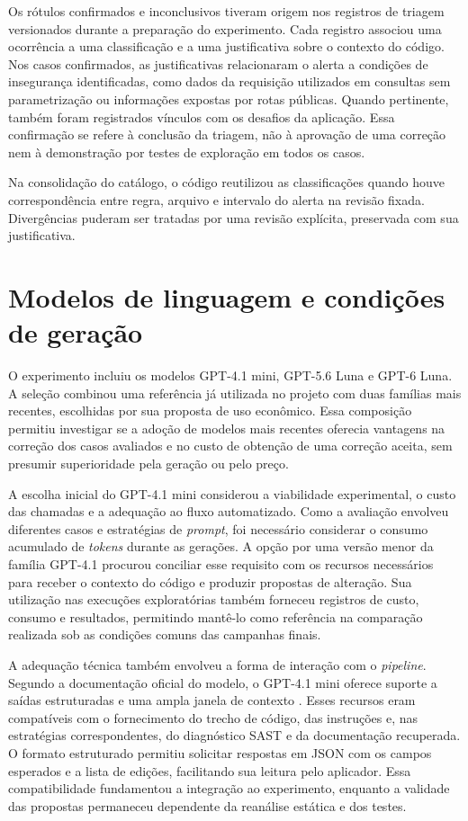Os rótulos confirmados e inconclusivos tiveram origem nos registros de triagem versionados durante a preparação do experimento. Cada registro associou uma ocorrência a uma classificação e a uma justificativa sobre o contexto do código. Nos casos confirmados, as justificativas relacionaram o alerta a condições de insegurança identificadas, como dados da requisição utilizados em consultas sem parametrização ou informações expostas por rotas públicas. Quando pertinente, também foram registrados vínculos com os desafios da aplicação. Essa confirmação se refere à conclusão da triagem, não à aprovação de uma correção nem à demonstração por testes de exploração em todos os casos.

Na consolidação do catálogo, o código reutilizou as classificações quando houve correspondência entre regra, arquivo e intervalo do alerta na revisão fixada. Divergências puderam ser tratadas por uma revisão explícita, preservada com sua justificativa.

\section{Modelos de linguagem e condições de geração}
\label{sec:met-modelos}

O experimento incluiu os modelos GPT-4.1 mini, GPT-5.6 Luna e GPT-6 Luna. A seleção combinou uma referência já utilizada no projeto com duas famílias mais recentes, escolhidas por sua proposta de uso econômico. Essa composição permitiu investigar se a adoção de modelos mais recentes oferecia vantagens na correção dos casos avaliados e no custo de obtenção de uma correção aceita, sem presumir superioridade pela geração ou pelo preço.

A escolha inicial do GPT-4.1 mini considerou a viabilidade experimental, o custo das chamadas e a adequação ao fluxo automatizado. Como a avaliação envolveu diferentes casos e estratégias de \textit{prompt}, foi necessário considerar o consumo acumulado de \textit{tokens} durante as gerações. A opção por uma versão menor da família GPT-4.1 procurou conciliar esse requisito com os recursos necessários para receber o contexto do código e produzir propostas de alteração. Sua utilização nas execuções exploratórias também forneceu registros de custo, consumo e resultados, permitindo mantê-lo como referência na comparação realizada sob as condições comuns das campanhas finais.

A adequação técnica também envolveu a forma de interação com o \textit{pipeline}. Segundo a documentação oficial do modelo, o GPT-4.1 mini oferece suporte a saídas estruturadas e uma ampla janela de contexto \cite{openai_gpt41mini}. Esses recursos eram compatíveis com o fornecimento do trecho de código, das instruções e, nas estratégias correspondentes, do diagnóstico SAST e da documentação recuperada. O formato estruturado permitiu solicitar respostas em JSON com os campos esperados e a lista de edições, facilitando sua leitura pelo aplicador. Essa compatibilidade fundamentou a integração ao experimento, enquanto a validade das propostas permaneceu dependente da reanálise estática e dos testes.

